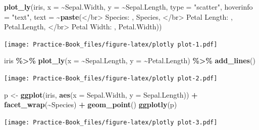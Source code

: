 \documentclass[
]{book}
\newenvironment{Shaded}{\begin{snugshade}}{\end{snugshade}}
\newcommand{\DataTypeTok}[1]{\textcolor[rgb]{0.13,0.29,0.53}{#1}}
\newcommand{\KeywordTok}[1]{\textcolor[rgb]{0.13,0.29,0.53}{\textbf{#1}}}
\newcommand{\NormalTok}[1]{#1}
\newcommand{\OperatorTok}[1]{\textcolor[rgb]{0.81,0.36,0.00}{\textbf{#1}}}
\newcommand{\StringTok}[1]{\textcolor[rgb]{0.31,0.60,0.02}{#1}}
\begin{document}
\begin{Shaded}
\begin{Highlighting}[]
\KeywordTok{plot\_ly}\NormalTok{(iris, }\DataTypeTok{x =} \OperatorTok{\textasciitilde{}}\NormalTok{Sepal.Width, }\DataTypeTok{y =} \OperatorTok{\textasciitilde{}}\NormalTok{Sepal.Length, }\DataTypeTok{type =} \StringTok{"scatter"}\NormalTok{, }
        \DataTypeTok{hoverinfo =} \StringTok{"text"}\NormalTok{,}
        \DataTypeTok{text =} \OperatorTok{\textasciitilde{}}\KeywordTok{paste}\NormalTok{(}\StringTok{\textquotesingle{}\textless{}/br\textgreater{} Species: \textquotesingle{}}\NormalTok{, Species,}
                      \StringTok{\textquotesingle{}\textless{}/br\textgreater{} Petal Length: \textquotesingle{}}\NormalTok{, Petal.Length,}
                      \StringTok{\textquotesingle{}\textless{}/br\textgreater{} Petal Width: \textquotesingle{}}\NormalTok{, Petal.Width))}
\end{Highlighting}
\end{Shaded}

\texttt{[image: Practice-Book\_files/figure-latex/plotly plot-1.pdf]}

\begin{Shaded}
\begin{Highlighting}[]
\NormalTok{iris }\OperatorTok{\%\textgreater{}\%}
\StringTok{  }\KeywordTok{plot\_ly}\NormalTok{(}\DataTypeTok{x =} \OperatorTok{\textasciitilde{}}\NormalTok{Sepal.Length, }\DataTypeTok{y =} \OperatorTok{\textasciitilde{}}\NormalTok{Petal.Length) }\OperatorTok{\%\textgreater{}\%}
\StringTok{  }\KeywordTok{add\_lines}\NormalTok{()}
\end{Highlighting}
\end{Shaded}

\texttt{[image: Practice-Book\_files/figure-latex/plotly plot-2.pdf]}

\begin{Shaded}
\begin{Highlighting}[]
\NormalTok{p \textless{}{-}}\StringTok{ }\KeywordTok{ggplot}\NormalTok{(iris, }\KeywordTok{aes}\NormalTok{(}\DataTypeTok{x =}\NormalTok{ Sepal.Width, }\DataTypeTok{y =}\NormalTok{ Sepal.Length)) }\OperatorTok{+}\StringTok{ }\KeywordTok{facet\_wrap}\NormalTok{(}\OperatorTok{\textasciitilde{}}\NormalTok{Species) }\OperatorTok{+}\StringTok{  }\KeywordTok{geom\_point}\NormalTok{()}
\KeywordTok{ggplotly}\NormalTok{(p)}
\end{Highlighting}
\end{Shaded}

\texttt{[image: Practice-Book\_files/figure-latex/plotly plot-3.pdf]}
\end{document}
